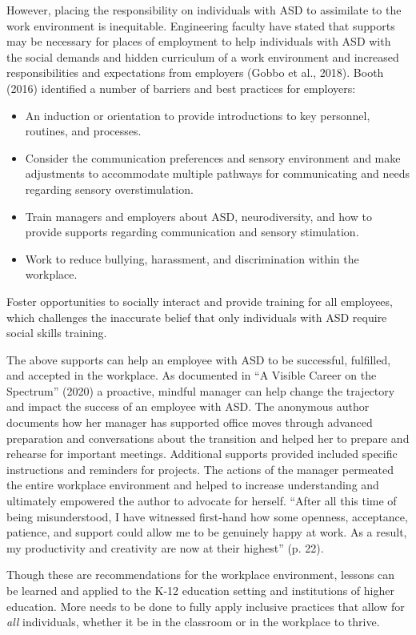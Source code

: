 \documentclass[11.5pt]{sig-alternate}
\begin{document}
\begin{large}
However, placing the responsibility on individuals with ASD to assimilate to the work environment is inequitable. Engineering faculty have stated that supports may be necessary for places of employment to help individuals with ASD with the social demands and hidden curriculum of a work environment and increased responsibilities and expectations from employers (Gobbo et al., 2018). Booth (2016) identified a number of barriers and best practices for employers: 

\begin{itemize}
    \item An induction or orientation to provide introductions to key personnel, routines, and processes.
    \item Consider the communication preferences and sensory environment and make adjustments to accommodate multiple pathways for communicating and needs regarding sensory overstimulation.
    \item Train managers and employers about ASD, neurodiversity, and how to provide supports regarding communication and sensory stimulation.
    \item Work to reduce bullying, harassment, and discrimination within the workplace.
\end{itemize}

Foster opportunities to socially interact and provide training for all employees, which challenges the inaccurate belief that only individuals with ASD require social skills training. 

The above supports can help an employee with ASD to be successful, fulfilled, and accepted in the workplace. As documented in “A Visible Career on the Spectrum” (2020) a proactive, mindful manager can help change the trajectory and impact the success of an employee with ASD. The anonymous author documents how her manager has supported office moves through advanced preparation and conversations about the transition and helped her to prepare and rehearse for important meetings. Additional supports provided included specific instructions and reminders for projects. The actions of the manager permeated the entire workplace environment and helped to increase understanding and ultimately empowered the author to advocate for herself. “After all this time of being misunderstood, I have witnessed first-hand how some openness, acceptance, patience, and support could allow me to be genuinely happy at work. As a result, my productivity and creativity are now at their highest” (p. 22).

Though these are recommendations for the workplace environment, lessons can be learned and applied to the K-12 education setting and institutions of higher education. More needs to be done to fully apply inclusive practices that allow for \textit{all} individuals, whether it be in the classroom or in the workplace to thrive. 


\end{large}
\end{document}
